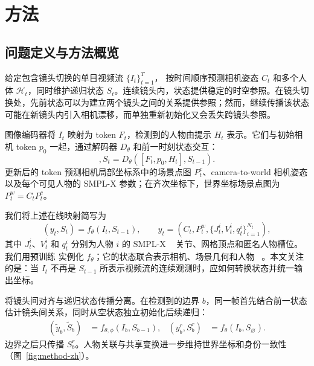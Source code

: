 \section{方法}
\label{sec:method-zh}

\subsection{问题定义与方法概览}

给定包含镜头切换的单目视频流 $\{I_t\}_{t=1}^{T}$，\method{} 按时间顺序预测相机姿态 $C_t$ 和多个人体 $\mathcal H_t$，同时维护递归状态 $S_t$。连续镜头内，状态提供稳定的时空参照。在镜头切换处，先前状态可以为建立两个镜头之间的关系提供参照；然而，继续传播该状态可能在新镜头内引入相机漂移，而单独重新初始化又会丢失跨镜头参照。

图像编码器将 $I_t$ 映射为 token $F_t$，检测到的人物由提示 $H_t$ 表示。它们与初始相机 token $p_0$ 一起，通过解码器 $D_\theta$ 和前一时刻状态交互：
\begin{equation}
 [F'_t,p_t,H'_t],S_t=D_\theta([F_t,p_0,H_t],S_{t-1}).
 \label{eq:stateful-reconstruction-zh}
\end{equation}
更新后的 token 预测相机局部坐标系中的场景点图 $P_t^c$、camera-to-world 相机姿态以及每个可见人物的 SMPL-X 参数；在齐次坐标下，世界坐标场景点图为 $P_t^w=C_tP_t^c$。

我们将上述在线映射简写为
\begin{equation}
 (y_t,S_t)=f_\theta(I_t,S_{t-1}),\qquad
 y_t=\left(C_t,P_t^w,\{J_t^i,V_t^i,q_t^i\}_{i=1}^{N_t}\right),
 \label{eq:online-map-zh}
\end{equation}
其中 $J_t^i$、$V_t^i$ 和 $q_t^i$ 分别为人物 $i$ 的 SMPL-X
~\citep{pavlakos2019smplx}
关节、网格顶点和匿名人物槽位。我们用预训练 \humanthree{} 实例化 $f_\theta$；它的状态联合表示相机、场景几何和人物
~\citep{chen2026human3r}。本文关注的是：当 $I_t$ 不再是 $S_{t-1}$ 所表示视频流的连续观测时，应如何转换状态并统一输出坐标。

\method{} 将镜头间对齐与递归状态传播分离。在检测到的边界 $b$，同一帧首先结合前一状态估计镜头间关系，同时从空状态独立初始化后续递归：
\begin{equation}
\begin{aligned}
 (\widetilde y_b,\widetilde S_b)&=f_{\theta,\phi}(I_b,S_{b-1}), &
 (y_b^r,S_b^r)&=f_\theta(I_b,S_{\varnothing}).
\end{aligned}
\label{eq:boundary-paths-zh}
\end{equation}
边界之后只传播 $S_b^r$。人物关联与共享变换进一步维持世界坐标和身份一致性（图~\ref{fig:method-zh}）。

